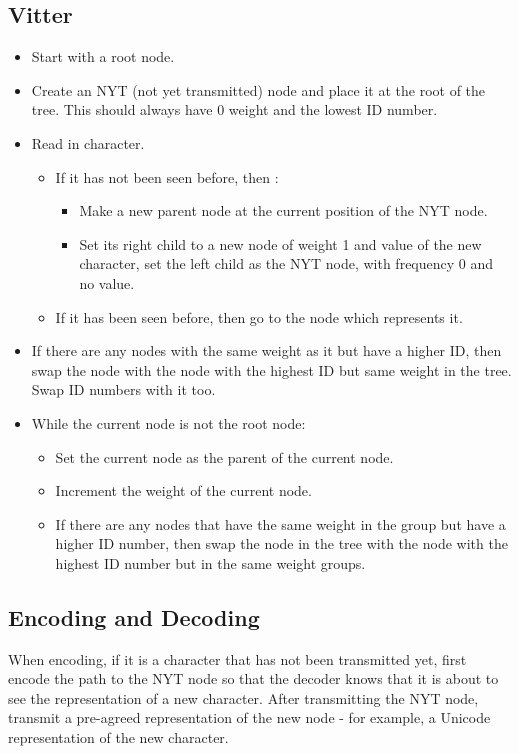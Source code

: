 \documentclass[12pt, letterpaper]{article}
\begin{document}
\subsection{Vitter}
\begin{itemize}
\item Start with a root node.
\item Create an NYT (not yet transmitted) node and place it at the root of the tree. This should always have 0 weight and the lowest ID number.
\item Read in character.
\begin{itemize}
\item If it has not been seen before, then :
\begin{itemize}
\item Make a new parent node at the current position of the NYT node.
\item Set its right child to a new node of weight 1 and value of the new character, set the left child as the NYT node, with frequency 0 and no value.
\end{itemize}
\item If it has been seen before, then go to the node which represents it.
\end{itemize}
\item If there are any nodes with the same weight as it but have a higher ID, then swap the node with the node with the highest ID but same weight in the tree. Swap ID numbers with it too.
\item While the current node is not the root node:
\begin{itemize}
\item Set the current node as the parent of the current node.
\item Increment the weight of the current node.
\item If there are any nodes that have the same weight in the group but have a higher ID number, then swap the node in the tree with the node with the highest ID number but in the same weight groups.
\end{itemize}

\end{itemize}
\newpage
\subsection{Encoding and Decoding}
When encoding, if it is a character that has not been transmitted yet, first encode the path to the NYT node so that the decoder knows that it is about to see the representation of a new character. After transmitting the NYT node, transmit a pre-agreed representation of the new node - for example, a Unicode representation of the new character.
\end{document}
